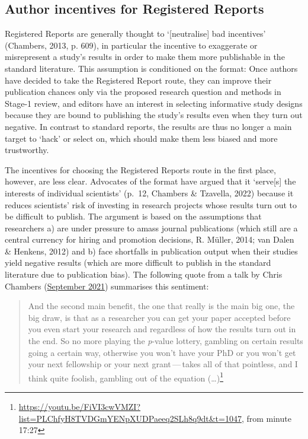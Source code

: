 \documentclass[
  ,man,mask,floatsintext]{apa6}
\begin{document}
\hypertarget{author-incentives-for-registered-reports}{%
\subsection{Author incentives for Registered Reports}\label{author-incentives-for-registered-reports}}

Registered Reports are generally thought to `{[}neutralise{]} bad incentives' (Chambers, 2013, p. 609), in particular the incentive to exaggerate or misrepresent a study's results in order to make them more publishable in the standard literature.
This assumption is conditioned on the format:
Once authors have decided to take the Registered Report route, they can improve their publication chances only via the proposed research question and methods in Stage-1 review, and editors have an interest in selecting informative study designs because they are bound to publishing the study's results even when they turn out negative.
In contrast to standard reports, the results are thus no longer a main target to `hack' or select on, which should make them less biased and more trustworthy.

The incentives for choosing the Registered Reports route in the first place, however, are less clear.
Advocates of the format have argued that it `serve{[}s{]} the interests of individual scientists' (p.~12, Chambers \& Tzavella, 2022) because it reduces scientists' risk of investing in research projects whose results turn out to be difficult to publish.
The argument is based on the assumptions that researchers a) are under pressure to amass journal publications (which still are a central currency for hiring and promotion decisions, R. Müller, 2014; van Dalen \& Henkens, 2012) and b) face shortfalls in publication output when their studies yield negative results (which are more difficult to publish in the standard literature due to publication bias).
The following quote from a talk by Chris Chambers (\href{https://youtu.be/FiVI3cwVMZI?list=PLChfyH8TVDGmYENpXUDPaeeq2SLh8q9dt\&t=1047}{September 2021}) summarises this sentiment:

\begin{quote}
And the second main benefit, the one that really is the main big one, the big draw, is that as a researcher you can get your paper accepted before you even start your research and regardless of how the results turn out in the end. So no more playing the \emph{p}-value lottery, gambling on certain results going a certain way, otherwise you won't have your PhD or you won't get your next fellowship or your next grant\(\,\)---\(\,\)takes all of that pointless, and I think quite foolish, gambling out of the equation (\ldots)\footnote{\url{https://youtu.be/FiVI3cwVMZI?list=PLChfyH8TVDGmYENpXUDPaeeq2SLh8q9dt\&t=1047}, from minute 17:27}
\end{quote}
\end{document}
